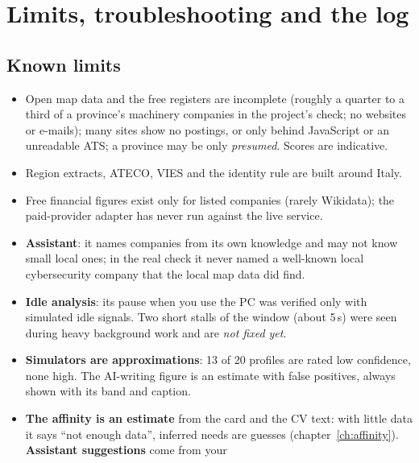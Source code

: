 \chapter{Limits, troubleshooting and the log}\label{ch:troubleshooting}

\section{Known limits}
\begin{itemize}
  \item Open map data and the free registers are incomplete (roughly a quarter to a third of a province's machinery
        companies in the project's check; no websites or e-mails); many sites show no postings, or only behind
        JavaScript or an unreadable ATS; a province may be only \emph{presumed}. Scores are indicative.
  \item Region extracts, ATECO, VIES and the identity rule are built around Italy.
  \item Free financial figures exist only for listed companies (rarely Wikidata); the paid-provider adapter has never
        run against the live service.
  \item \textbf{Assistant}: it names companies from its own knowledge and may not know small local ones; in the real check it never named a well-known local cybersecurity company that the local map data did find.
  \item \textbf{Idle analysis}: its pause when you use the PC was verified only with simulated idle signals. Two short stalls of the window (about 5\,s) were seen during heavy background work and are \emph{not fixed yet}.
  \item \textbf{Simulators are approximations}: 13 of 20 profiles are rated low confidence, none high. The AI-writing
        figure is an estimate with false positives, always shown with its band and caption.
  \item \textbf{The affinity is an estimate} from the card and the CV text: with little data it says ``not enough
        data'', inferred needs are guesses (chapter~\ref{ch:affinity}). \textbf{Assistant suggestions} come from your

\end{itemize}
